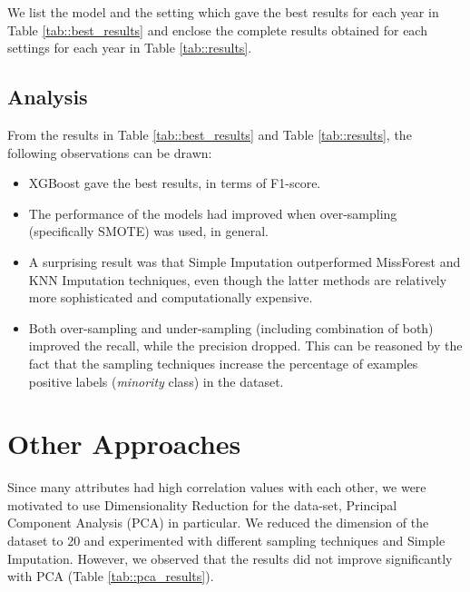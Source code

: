 \documentclass[11pt,a4paper]{article}
\begin{document}

We list the model and the setting which gave the best results for each year in Table \ref{tab::best_results} and enclose the complete results obtained for each settings for each year in Table \ref{tab::results}.


\subsection{Analysis}
From the results in Table \ref{tab::best_results} and Table \ref{tab::results}, the following observations can be drawn:
\begin{itemize}
    \item XGBoost gave the best results, in terms of F1-score.
    \item The performance of the models had improved when over-sampling (specifically SMOTE) was used, in general.
    \item A surprising result was that Simple Imputation outperformed MissForest and KNN Imputation techniques, even though the latter methods are relatively more sophisticated and computationally expensive. 
    \item Both over-sampling and under-sampling (including combination of both) improved the recall, while the precision dropped. This can be reasoned by the fact that the sampling techniques increase the percentage of examples positive labels (\textit{minority} class) in the dataset. 
    
    
\end{itemize}


\section{Other Approaches}
Since many attributes had high correlation values with each other, we were motivated to use Dimensionality Reduction for the data-set, Principal Component Analysis (PCA) \cite{PCA:12} in particular. We reduced the dimension of the dataset to 20 and experimented with different sampling techniques and Simple Imputation.
However, we observed that the results did not improve significantly with PCA (Table \ref{tab::pca_results}).
\end{document}
